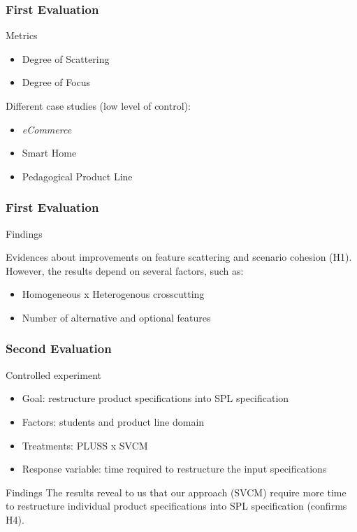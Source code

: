 \documentclass[xcolor=svgnames]{beamer}
\begin{document}
\begin{frame}
\frametitle{First Evaluation}

\begin{block}{Metrics}
\begin{itemize}
  \item Degree of Scattering 
  \item Degree of Focus
\end{itemize}
\end{block}

\begin{block}{Different case studies (low level of control):}
\begin{itemize}
  \item \emph{eCommerce}
  \item Smart Home
  \item Pedagogical Product Line
\end{itemize}
\end{block}

\end{frame}

\begin{frame}
\frametitle{First Evaluation}

\begin{block}{Findings}

Evidences about improvements on feature scattering and scenario
cohesion (H1). However, the results depend on several factors, such as:

\begin{itemize}
  \item Homogeneous x Heterogenous crosscutting 
  \item Number of alternative and optional features
\end{itemize} 
\end{block}

\end{frame}

\begin{frame}

\frametitle{Second Evaluation}

\begin{block}{Controlled experiment}
\begin{itemize}
\item Goal: restructure product specifications into SPL specification
\item Factors: students and product line domain
\item Treatments: PLUSS x SVCM
\item Response variable: time required to restructure the input specifications  
\end{itemize}
\end{block}

\begin{block}{Findings}
The results reveal to us that our approach (SVCM) require more time to 
restructure individual product specifications into SPL specification (confirms H4).   
\end{block}
\end{frame}
\end{document}
